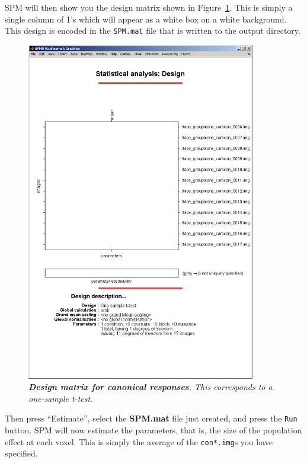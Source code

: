SPM will then show you the design matrix shown in Figure~\ref{t1}. This is simply a single column of 1's which will appear as a white box on a white background. This design is encoded in the \texttt{SPM.mat} file that is written to the output directory.
\begin{figure}
\begin{center}
\includegraphics[width=100mm]{faces_group/t1}
\caption{\em \textbf{Design matrix for canonical responses}. This corresponds to a one-sample t-test. \label{t1}}
\end{center}
\end{figure}
Then press ``Estimate'', select the \textbf{SPM.mat} file just created, and press the \texttt{Run} button.
SPM will now estimate the parameters, that is, the size of the population effect at each voxel. This is simply the average of the \texttt{con*.img}s you have specified.

